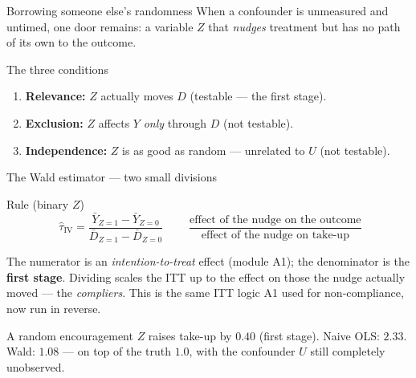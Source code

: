 \documentclass[aspectratio=169,11pt]{beamer}
\begin{document}
\begin{frame}{Borrowing someone else's randomness}
  When a confounder is unmeasured and untimed, one door remains: a variable $Z$ that
  \emph{nudges} treatment but has no path of its own to the outcome.
  \begin{center}
  \end{center}
  \begin{block}{The three conditions}
    \begin{enumerate}
      \item \textbf{Relevance:} $Z$ actually moves $D$ (testable --- the first stage).
      \item \textbf{Exclusion:} $Z$ affects $Y$ \emph{only} through $D$ (not testable).
      \item \textbf{Independence:} $Z$ is as good as random --- unrelated to $U$
            (not testable).
    \end{enumerate}
  \end{block}
\end{frame}

\begin{frame}{The Wald estimator --- two small divisions}
  \begin{block}{Rule (binary $Z$)}
    \[
      \boxed{\;\hat\tau_{\text{IV}}
        = \frac{\bar Y_{Z=1} - \bar Y_{Z=0}}{\bar D_{Z=1} - \bar D_{Z=0}}\;}
      \qquad
      \frac{\text{effect of the nudge on the outcome}}{\text{effect of the nudge on take-up}}
    \]
  \end{block}
  \begin{readme}
    The numerator is an \emph{intention-to-treat} effect (module A1); the
    denominator is the \textbf{first stage}. Dividing scales the ITT up to the
    effect on those the nudge actually moved --- the \emph{compliers}. This is the
    same ITT logic A1 used for non-compliance, now run in reverse.
  \end{readme}
  \begin{numexample}
    A random encouragement $Z$ raises take-up by $0.40$ (first stage). Naive OLS:
    $\mathbf{2.33}$. Wald: $\mathbf{1.08}$ --- on top of the truth $1.0$, with the
    confounder $U$ still completely unobserved.
  \end{numexample}
\end{frame}
\end{document}

